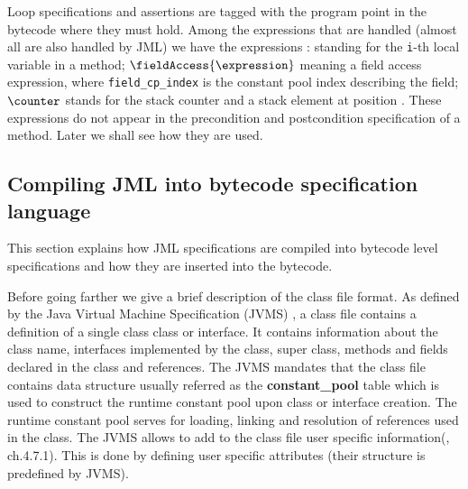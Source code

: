 Loop specifications and assertions are tagged with the program point in the bytecode where they must hold. Among the expressions 
that are handled (almost all are also handled
by JML) we have the expressions :  standing for the \texttt{i}-th local variable in a method; 
$\fieldAccess{\expression}$ meaning a field access expression, where \texttt{field\_cp\_index} is the constant pool index
describing the field; $\counter$ stands for the stack counter and \stack{\ArithExpr} a stack element at position \ArithExpr. These expressions do not appear in the precondition and postcondition specification of a method. Later we shall see how they are used.
 
 
\subsection{Compiling JML into bytecode specification language}\label{comJML}

This section explains how JML specifications are compiled into bytecode level specifications and how they are inserted into the bytecode. 
 
Before going farther we give a brief description of the class file format. As defined by the Java Virtual Machine Specification (JVMS) \cite{VMSpec}, a class file contains a definition of a single class class or interface. It contains information about the class name, interfaces implemented by the class, super class, methods and fields declared in the class and references. The JVMS mandates that the class file contains data structure usually referred as the \textbf{constant\_pool} table which is used to construct the runtime constant pool upon class or interface creation. The runtime constant pool serves for loading, linking and resolution of references used in the class. The JVMS allows to add to the class file user specific information(\cite{VMSpec}, ch.4.7.1). This is done by defining user specific attributes  (their structure is predefined by JVMS).

